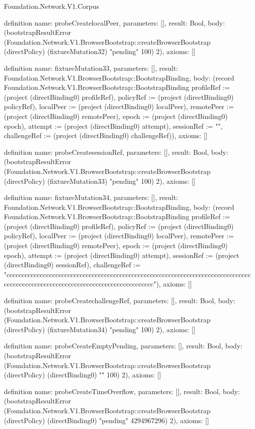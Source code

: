 \begin{lexlean}{Foundation.Network.V1.Corpus}
\begin{semanticmodule}
definition{
  name: probeCreatelocalPeer,
  parameters: [],
  result: Bool,
  body: (bootstrapResultError (Foundation.Network.V1.BrowserBootstrap::createBrowserBootstrap (directPolicy) (fixtureMutation32) "pending" 100) 2),
  axioms: []
}

definition{
  name: fixtureMutation33,
  parameters: [],
  result: Foundation.Network.V1.BrowserBootstrap::BootstrapBinding,
  body: (record Foundation.Network.V1.BrowserBootstrap::BootstrapBinding {profileRef := (project (directBinding0) profileRef), policyRef := (project (directBinding0) policyRef), localPeer := (project (directBinding0) localPeer), remotePeer := (project (directBinding0) remotePeer), epoch := (project (directBinding0) epoch), attempt := (project (directBinding0) attempt), sessionRef := "", challengeRef := (project (directBinding0) challengeRef)}),
  axioms: []
}

definition{
  name: probeCreatesessionRef,
  parameters: [],
  result: Bool,
  body: (bootstrapResultError (Foundation.Network.V1.BrowserBootstrap::createBrowserBootstrap (directPolicy) (fixtureMutation33) "pending" 100) 2),
  axioms: []
}

definition{
  name: fixtureMutation34,
  parameters: [],
  result: Foundation.Network.V1.BrowserBootstrap::BootstrapBinding,
  body: (record Foundation.Network.V1.BrowserBootstrap::BootstrapBinding {profileRef := (project (directBinding0) profileRef), policyRef := (project (directBinding0) policyRef), localPeer := (project (directBinding0) localPeer), remotePeer := (project (directBinding0) remotePeer), epoch := (project (directBinding0) epoch), attempt := (project (directBinding0) attempt), sessionRef := (project (directBinding0) sessionRef), challengeRef := "ccccccccccccccccccccccccccccccccccccccccccccccccccccccccccccccccccccccccccccccccccccccccccccccccccccccccccccccccccccccccccccccccc"}),
  axioms: []
}

definition{
  name: probeCreatechallengeRef,
  parameters: [],
  result: Bool,
  body: (bootstrapResultError (Foundation.Network.V1.BrowserBootstrap::createBrowserBootstrap (directPolicy) (fixtureMutation34) "pending" 100) 2),
  axioms: []
}

definition{
  name: probeCreateEmptyPending,
  parameters: [],
  result: Bool,
  body: (bootstrapResultError (Foundation.Network.V1.BrowserBootstrap::createBrowserBootstrap (directPolicy) (directBinding0) "" 100) 2),
  axioms: []
}

definition{
  name: probeCreateTimeOverflow,
  parameters: [],
  result: Bool,
  body: (bootstrapResultError (Foundation.Network.V1.BrowserBootstrap::createBrowserBootstrap (directPolicy) (directBinding0) "pending" 4294967296) 2),
  axioms: []
}


\end{semanticmodule}
\end{lexlean}
